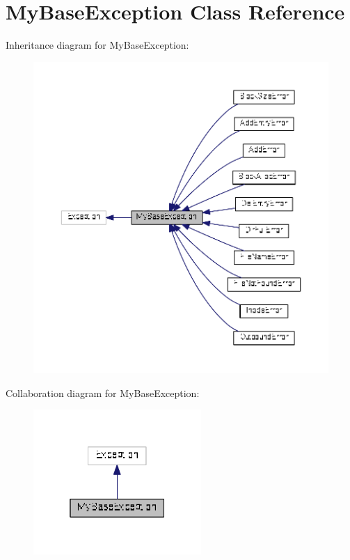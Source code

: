 \hypertarget{classbloc__device_1_1_my_base_exception}{}\section{My\+Base\+Exception Class Reference}
\label{classbloc__device_1_1_my_base_exception}


Inheritance diagram for My\+Base\+Exception\+:
\nopagebreak
\begin{figure}[H]
\begin{center}
\leavevmode
\includegraphics[width=350pt]{classbloc__device_1_1_my_base_exception__inherit__graph}
\end{center}
\end{figure}


Collaboration diagram for My\+Base\+Exception\+:
\nopagebreak
\begin{figure}[H]
\begin{center}
\leavevmode
\includegraphics[width=181pt]{classbloc__device_1_1_my_base_exception__coll__graph}
\end{center}
\end{figure}
